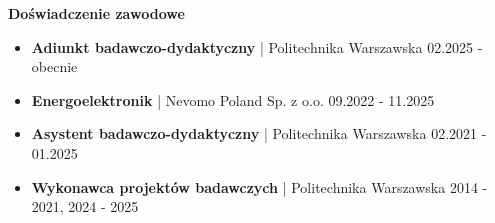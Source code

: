 \documentclass[10pt,A4]{article}
\newcommand{\cvsection}[1]
{
	\begin{center}
		\large\textcolor{sectcol}{\textbf{#1}}
	\end{center}
}
\newcommand{\cvevent}[4]
{

\begin{tabular*}{1\textwidth}{p{13.6cm}  x{3.9cm}}
	\textbf{#2} - \textcolor{bgcol}{#3} &   \vspace{2.5pt}\textcolor{sectcol}{#1}
\end{tabular*}

\vspace{-8pt}
\textcolor{black}{\hrule}
\vspace{6pt}

	\foreach \desc in {#4}{
		$\bullet$ \desc\\[3pt]
	}
	
\vspace{3pt}
}
\begin{document}



\cvsection{Doświadczenie zawodowe}
\begin{itemize}[label=$\bullet$, nolistsep, leftmargin=*]
	\item \textbf{Adiunkt badawczo-dydaktyczny} | Politechnika Warszawska \hfill  02.2025 - obecnie
	\item \textbf{Energoelektronik} | Nevomo Poland Sp. z o.o. \hfill 09.2022 - 11.2025
	\item \textbf{Asystent badawczo-dydaktyczny} | Politechnika Warszawska \hfill 02.2021 - 01.2025
	\item \textbf{Wykonawca projektów badawczych} | Politechnika Warszawska \hfill 2014 - 2021, 2024 - 2025
\end{itemize}
\end{document}
